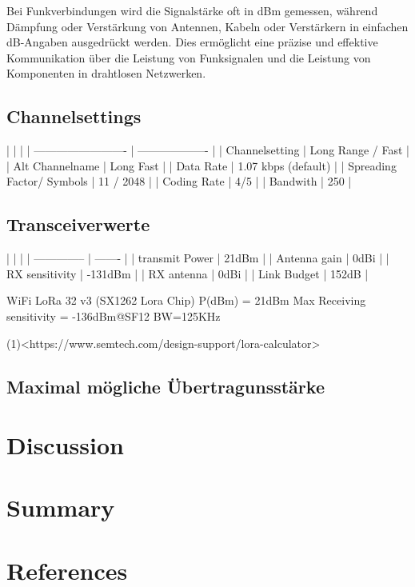 \documentclass[12pt,a4paper]{article}
\begin{document}
Bei Funkverbindungen wird die Signalstärke oft in dBm gemessen, während Dämpfung oder Verstärkung von Antennen, Kabeln oder Verstärkern in einfachen dB-Angaben ausgedrückt werden. Dies ermöglicht eine präzise und effektive Kommunikation über die Leistung von Funksignalen und die Leistung von Komponenten in drahtlosen Netzwerken.

\subsection{Channelsettings}

|                           |                     |
| ------------------------- | ------------------- |
| Channelsetting            | Long Range / Fast   |
| Alt Channelname           | Long Fast           |
| Data Rate                 | 1.07 kbps (default) |
| Spreading Factor/ Symbols | 11 / 2048           |
| Coding Rate               | 4/5                 |
| Bandwith                  | 250                 |

\subsection{Transceiverwerte}

|                |         |
| -------------- | ------- |
| transmit Power | 21dBm   |
| Antenna gain   | 0dBi  |
| RX sensitivity | -131dBm |
| RX antenna     | 0dBi    |
| Link Budget    | 152dB   |

WiFi LoRa 32 v3 (SX1262 Lora Chip)
P(dBm) = 21dBm
Max Receiving sensitivity = -136dBm@SF12 BW=125KHz

(1)<https://www.semtech.com/design-support/lora-calculator>

\subsection{Maximal mögliche Übertragunsstärke}





\newpage

\section{Discussion}
\section{Summary}
\section{References}
\end{document}
